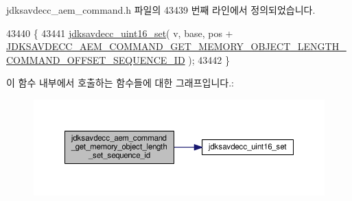 jdksavdecc\+\_\+aem\+\_\+command.\+h 파일의 43439 번째 라인에서 정의되었습니다.


\begin{DoxyCode}
43440 \{
43441     \hyperlink{group__endian_ga14b9eeadc05f94334096c127c955a60b}{jdksavdecc\_uint16\_set}( v, base, pos + 
      \hyperlink{group__command__get__memory__object__length_gafe050f07f7b965dc2606f7140b97c0fd}{JDKSAVDECC\_AEM\_COMMAND\_GET\_MEMORY\_OBJECT\_LENGTH\_COMMAND\_OFFSET\_SEQUENCE\_ID}
       );
43442 \}
\end{DoxyCode}


이 함수 내부에서 호출하는 함수들에 대한 그래프입니다.\+:
\nopagebreak
\begin{figure}[H]
\begin{center}
\leavevmode
\includegraphics[width=350pt]{group__command__get__memory__object__length_gacf759057e3283b97fd7a994eef07a42c_cgraph}
\end{center}
\end{figure}



